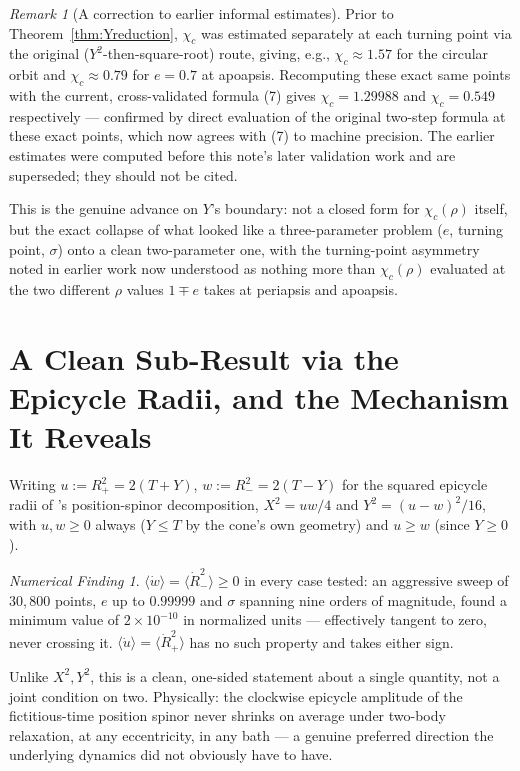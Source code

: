 \documentclass[12pt]{amsart}
\theoremstyle{plain}
\theoremstyle{remark}
\newtheorem*{remark}{Remark}
\newtheorem*{finding}{Numerical Finding}
\begin{document}
\begin{remark}[A correction to earlier informal estimates]
Prior to Theorem~\ref{thm:Yreduction}, $\chi_c$ was estimated separately at each turning point via the original ($Y^2$-then-square-root) route, giving, e.g., $\chi_c\approx1.57$ for the circular orbit and $\chi_c\approx0.79$ for $e=0.7$ at apoapsis. Recomputing these exact same points with the current, cross-validated formula (7) gives $\chi_c=1.29988$ and $\chi_c=0.549$ respectively --- confirmed by direct evaluation of the original two-step formula at these exact points, which now agrees with (7) to machine precision. The earlier estimates were computed before this note's later validation work and are superseded; they should not be cited.
\end{remark}

This is the genuine advance on $Y$'s boundary: not a closed form for $\chi_c(\rho)$ itself, but the exact collapse of what looked like a three-parameter problem ($e$, turning point, $\sigma$) onto a clean two-parameter one, with the turning-point asymmetry noted in earlier work now understood as nothing more than $\chi_c(\rho)$ evaluated at the two different $\rho$ values $1\mp e$ takes at periapsis and apoapsis.

\section{A Clean Sub-Result via the Epicycle Radii, and the Mechanism It Reveals}\label{sec:Rminus}

Writing $u:=R_+^2=2(T+Y)$, $w:=R_-^2=2(T-Y)$ for the squared epicycle radii of \cite{Ebert2026LeviCivita}'s position-spinor decomposition, $X^2=uw/4$ and $Y^2=(u-w)^2/16$, with $u,w\geq0$ always ($Y\leq T$ by the cone's own geometry) and $u\geq w$ (since $Y\geq0$).

\begin{finding}\label{find:Rminus}
$\langle\dot w\rangle=\langle\dot R_-^2\rangle\geq0$ in every case tested: an aggressive sweep of $30{,}800$ points, $e$ up to $0.99999$ and $\sigma$ spanning nine orders of magnitude, found a minimum value of $2\times10^{-10}$ in normalized units --- effectively tangent to zero, never crossing it. $\langle\dot u\rangle=\langle\dot R_+^2\rangle$ has no such property and takes either sign.
\end{finding}

Unlike $X^2,Y^2$, this is a clean, one-sided statement about a single quantity, not a joint condition on two. Physically: the clockwise epicycle amplitude of the fictitious-time position spinor never shrinks on average under two-body relaxation, at any eccentricity, in any bath --- a genuine preferred direction the underlying dynamics did not obviously have to have.
\end{document}
